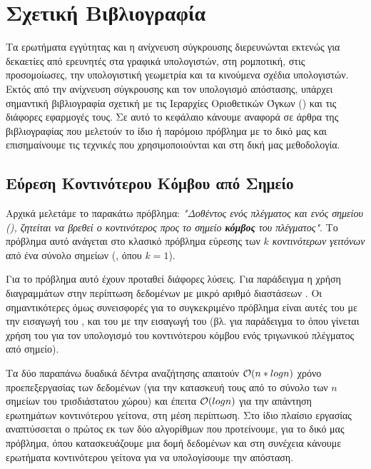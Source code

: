 \chapter{Σχετική Βιβλιογραφία}
\label{ch:related_work}
Τα ερωτήματα εγγύτητας και η ανίχνευση σύγκρουσης διερευνώνται 
εκτενώς για δεκαετίες από ερευνητές στα γραφικά υπολογιστών, στη ρομποτική,
στις προσομοίωσες, την υπολογιστική γεωμετρία και τα κινούμενα σχέδια 
υπολογιστών. 
Εκτός από την ανίχνευση σύγκρουσης και τον υπολογισμό απόστασης, υπάρχει
σημαντική βιβλιογραφία σχετική με τις Ιεραρχίες Οριοθετικών Όγκων 
() και τις διάφορες εφαρμογές τους. 
Σε αυτό το κεφάλαιο κάνουμε αναφορά σε άρθρα της βιβλιογραφίας 
που μελετούν το ίδιο ή παρόμοιο πρόβλημα με το δικό μας
και επισημαίνουμε τις τεχνικές που χρησιμοποιούνται 
και στη δική μας μεθοδολογία.

\section{Εύρεση Κοντινότερου Κόμβου από Σημείο}
\label{sec:nearest_node}
Αρχικά μελετάμε το παρακάτω πρόβλημα: \textit{"Δοθέντος ενός 
πλέγματος και ενός σημείου (), ζητείται να βρεθεί 
ο κοντινότερος προς το σημείο \textbf{κόμβος} του πλέγματος"}.
Το πρόβλημα αυτό ανάγεται στο κλασικό πρόβλημα εύρεσης των \textit{$k$ 
κοντινότερων γειτόνων} από ένα σύνολο σημείων (, όπου $k=1$). 

Για το πρόβλημα αυτό έχουν προταθεί διάφορες λύσεις. Για παράδειγμα 
η χρήση διαγραμμάτων  στην περίπτωση δεδομένων 
με μικρό αριθμό διαστάσεων \cite{aurenhammer1991voronoi}.
Οι σημαντικότερες όμως συνεισφορές για το συγκεκριμένο πρόβλημα είναι 
αυτές του \cite{bentley1975multidimensional} με την εισαγωγή του 
\textit{}, και του \cite{yianilos1993data} με την 
εισαγωγή του \textit{} (βλ. για παράδειγμα το
\cite{simon1996fast} όπου γίνεται χρήση του \textit{} για τον 
υπολογισμό του κοντινότερου κόμβου ενός τριγωνικού πλέγματος 
από σημείο).

Τα δύο παραπάνω δυαδικά δέντρα αναζήτησης απαιτούν $\mathcal{O}(n*logn)$
χρόνο προεπεξεργασίας των δεδομένων (για την κατασκευή τους
από το σύνολο των $n$ σημείων του τρισδιάστατου χώρου) και 
έπειτα $\mathcal{O}(logn)$ για την απάντηση ερωτημάτων κοντινότερου 
γείτονα, στη μέση περίπτωση. 
Στο ίδιο πλαίσιο εργασίας αναπτύσσεται ο πρώτος εκ των δύο αλγορίθμων που 
προτείνουμε, για το δικό μας πρόβλημα, όπου κατασκευάζουμε μια δομή 
δεδομένων και στη συνέχεια κάνουμε ερωτήματα κοντινότερου γείτονα 
για να υπολογίσουμε την απόσταση.

